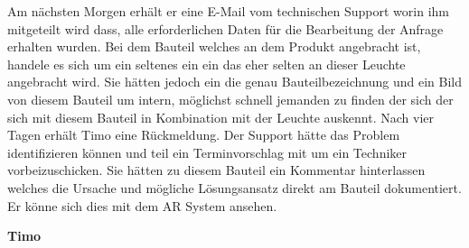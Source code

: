 Am nächsten Morgen erhält er eine E-Mail vom technischen Support worin ihm mitgeteilt wird dass,
alle erforderlichen Daten für die Bearbeitung der Anfrage erhalten wurden. Bei dem Bauteil welches
an dem Produkt angebracht ist, handele es sich um ein seltenes ein ein das eher selten an dieser
Leuchte angebracht wird. Sie hätten jedoch ein die genau Bauteilbezeichnung und ein Bild von
diesem Bauteil um intern, möglichst schnell jemanden zu finden der sich der sich mit diesem Bauteil
in Kombination mit der Leuchte auskennt.
Nach vier Tagen erhält Timo eine Rückmeldung. Der Support hätte das Problem identifizieren können
und teil ein Terminvorschlag mit um ein Techniker vorbeizuschicken. Sie hätten zu diesem Bauteil ein
Kommentar hinterlassen welches die Ursache und mögliche Lösungsansatz direkt am Bauteil
dokumentiert. Er könne sich dies mit dem AR System ansehen.


\vspace{2mm}
\textbf{Timo}

